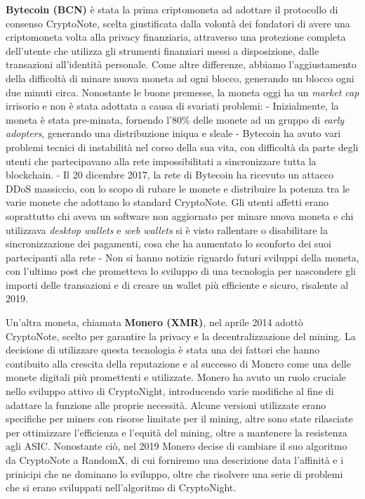 \documentclass[
]{article}
\begin{document}
\textbf{Bytecoin (BCN)} è stata la prima criptomoneta ad adottare il
protocollo di consenso CryptoNote, scelta giustificata dalla volontà dei
fondatori di avere una criptomoneta volta alla privacy finanziaria,
attraverso una protezione completa dell'utente che utilizza gli
strumenti finanziari messi a disposizione, dalle transazioni
all'identità personale. Come altre differenze, abbiamo l'aggiustamento
della difficoltà di minare nuova moneta ad ogni blocco, generando un
blocco ogni due minuti circa. Nonostante le buone premesse, la moneta
oggi ha un \emph{market cap} irrisorio e non è stata adottata a causa di
svariati problemi: - Inizialmente, la moneta è stata pre-minata,
fornendo l'80\% delle monete ad un gruppo di \emph{early adopters},
generando una distribuzione iniqua e sleale - Bytecoin ha avuto vari
problemi tecnici di instabilità nel corso della sua vita, con difficoltà
da parte degli utenti che partecipavano alla rete impossibilitati a
sincronizzare tutta la blockchain. - Il 20 dicembre 2017, la rete di
Bytecoin ha ricevuto un attacco DDoS massiccio, con lo scopo di rubare
le monete e distribuire la potenza tra le varie monete che adottano lo
standard CryptoNote. Gli utenti affetti erano soprattutto chi aveva un
software non aggiornato per minare nuova moneta e chi utilizzava
\emph{desktop wallets} e \emph{web wallets} si è visto rallentare o
disabilitare la sincronizzazione dei pagamenti, cosa che ha aumentato lo
sconforto dei suoi partecipanti alla rete - Non si hanno notizie
riguardo futuri sviluppi della moneta, con l'ultimo post che prometteva
lo sviluppo di una tecnologia per nascondere gli importi delle
transazioni e di creare un wallet più efficiente e sicuro, risalente al
2019.

\hfill\break
Un'altra moneta, chiamata \textbf{Monero (XMR)}, nel aprile 2014 adottò
CryptoNote, scelto per garantire la privacy e la decentralizzazione del
mining. La decisione di utilizzare questa tecnologia è stata una dei
fattori che hanno contibuito alla crescita della reputazione e al
successo di Monero come una delle monete digitali più promettenti e
utilizzate. Monero ha avuto un ruolo cruciale nello sviluppo attivo di
CryptoNight, introducendo varie modifiche al fine di adattare la
funzione alle proprie necessità. Alcune versioni utilizzate erano
specifiche per miners con risorse limitate per il mining, altre sono
state rilasciate per ottimizzare l'efficienza e l'equità del mining,
oltre a mantenere la resistenza agli ASIC. Nonostante ciò, nel 2019
Monero decise di cambiare il suo algoritmo da CryptoNote a RandomX, di
cui forniremo una descrizione data l'affinità e i prinicipi che ne
dominano lo sviluppo, oltre che risolvere una serie di problemi che si
erano sviluppati nell'algoritmo di CryptoNight.
\end{document}
